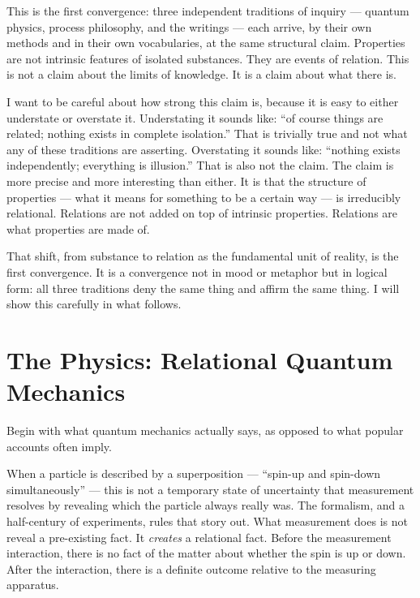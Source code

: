 This is the first convergence: three independent traditions of inquiry --- quantum physics, process philosophy, and the \bahai writings --- each arrive, by their own methods and in their own vocabularies, at the same structural claim. Properties are not intrinsic features of isolated substances. They are events of relation. This is not a claim about the limits of knowledge. It is a claim about what there is.

I want to be careful about how strong this claim is, because it is easy to either understate or overstate it. Understating it sounds like: ``of course things are related; nothing exists in complete isolation.'' That is trivially true and not what any of these traditions are asserting. Overstating it sounds like: ``nothing exists independently; everything is illusion.'' That is also not the claim. The claim is more precise and more interesting than either. It is that the structure of properties --- what it means for something to be a certain way --- is irreducibly relational. Relations are not added on top of intrinsic properties. Relations are what properties are made of.

That shift, from substance to relation as the fundamental unit of reality, is the first convergence. It is a convergence not in mood or metaphor but in logical form: all three traditions deny the same thing and affirm the same thing. I will show this carefully in what follows.

\section{The Physics: Relational Quantum Mechanics}
\label{sec:ch7-physics}

Begin with what quantum mechanics actually says, as opposed to what popular accounts often imply.

When a particle is described by a superposition --- ``spin-up and spin-down simultaneously'' --- this is not a temporary state of uncertainty that measurement resolves by revealing which the particle always really was. The formalism, and a half-century of experiments, rules that story out. What measurement does is not reveal a pre-existing fact. It \emph{creates} a relational fact. Before the measurement interaction, there is no fact of the matter about whether the spin is up or down. After the interaction, there is a definite outcome relative to the measuring apparatus.


